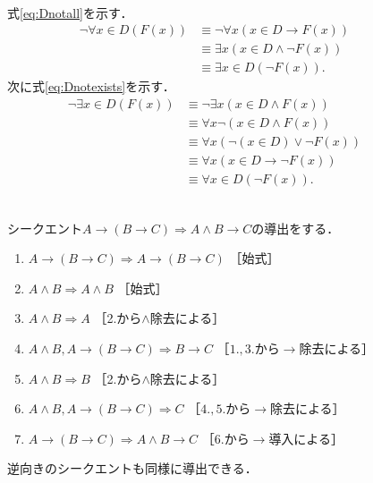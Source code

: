 \begin{description}
\item[] \mbox{} \\
  式\eqref{eq:Dnotall}を示す．
  \begin{align*}
    \lnot \forall x \in D ( F(x) ) & \equiv \lnot \forall x ( x \in D \to F(x) ) \\
                                   & \equiv \exists x ( x \in D \land \lnot F(x) ) \\
                                   & \equiv \exists x \in D ( \lnot F(x) ) .
  \end{align*}
  次に式\eqref{eq:Dnotexists}を示す．
  \begin{align*}
    \lnot \exists x \in D(F(x)) & \equiv \lnot \exists x ( x \in D \land F(x) ) \\
                                & \equiv \forall x \lnot ( x \in D \land F(x) ) \\
                                & \equiv \forall x ( \lnot ( x \in D) \lor \lnot F(x) ) \\
                                & \equiv \forall x ( x \in D \to \lnot F(x) ) \\
                                & \equiv \forall x \in D ( \lnot F(x) ).
  \end{align*}
\item[] \mbox{} \\
  シークエント$A \to ( B \to C) \Longrightarrow A \land B \to C$の導出をする．
    \begin{enumerate}[1. ]
      \item $A \to ( B \to C) \Longrightarrow A \to (B \to C)$ 
             \quad ［始式］
      \item $A \land B \Longrightarrow A \land B$ \quad ［始式］
      \item $A \land B \Longrightarrow A$ \quad ［2.から$\land$除去による］
      \item $A \land B ,  A \to ( B \to C) \Longrightarrow B \to C$
             \quad ［$1., 3.$から$\to$除去による］
      \item $A \land B \Longrightarrow B$ \quad ［2.から$\land$除去による］
      \item $A \land B ,  A \to ( B \to C) \Longrightarrow C$
             \quad ［$4., 5.$から$\to$除去による］
      \item $A \to (B \to C ) \Longrightarrow A \land B \to C$
             \quad ［6.から$\to$導入による］
    \end{enumerate}
    逆向きのシークエントも同様に導出できる．

\end{description}
